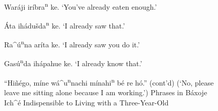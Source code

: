 \documentclass[output=paper]{LSP/langsci}
\begin{document}
\begin{figure}[p]
\begin{list}{}{}
\item{War\'aji ir\'ibra\textsuperscript{n} ke. `You've already eaten enough.'}
\item{}
\item{\'Ata ih\'adu\v{s}da\textsuperscript{n} ke.	`I already saw that.'}
\item{Ra\^{ }\'u\textsuperscript{n}na ar\'ita ke.	`I already saw you do it.'}
\item{Gas\'u\textsuperscript{n}da ih\'apahue ke.	 `I already know that.'}
\item{}
\end{list} 
\caption{``Hi\~n\'ego, m\'ine w\'a\^{ }u\textsuperscript{n}nachi m\'inahi\textsuperscript{n} b\'e re h\'o.'' (cont'd)\newline
(`No, please leave me sitting alone because I am working.')\newline
Phrases in B\'axoje Ich\^{ }\'e Indispensible to Living with a Three-Year-Old}
\label{phraselist2}
\end{figure}
\FloatBarrier
\end{document}
